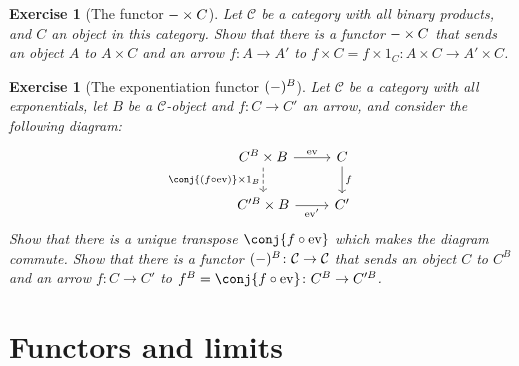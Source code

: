 \documentclass[article, a4paper, 11pt, oneside]{memoir}
\numberwithin{equation}{chapter}
\newcommand{\cat}[1]{\mathcal{#1}}
\newcommand{\catC}{\cat{C}}
\theoremstyle{myexample}
\theoremstyle{myexamplebreak}
\newtheorem{exercisebreak}[theorem]{Exercise}
\begin{document}
\begin{exercisebreak}[The functor $- \times C$]
    Let $\catC$ be a category with all binary products, and $C$ an object in this category. Show that there is a functor $- \times C$ that sends an object $A$ to $A \times C$ and an arrow $f \colon A \to A'$ to $f \times C = f \times 1_C \colon A \times C \to A' \times C$.
\end{exercisebreak}


\begin{exercisebreak}[The exponentiation functor $(-)^B$]
    Let $\catC$ be a category with all exponentials, let $B$ be a $\catC$-object and $f \colon C \to C'$ an arrow, and consider the following diagram:
    \begin{equation*}
        \begin{tikzcd}
            C^B \times B
                \ar[r, "\eval"]
                \ar[d, "\conj{(f \circ \eval)} \times 1_B", dashed, swap]
            & C
                \ar[d, "f"]
            \\
            C'^B \times B
                \ar[r, "\eval'", swap]
            & C'
        \end{tikzcd}
    \end{equation*}
    Show that there is a unique transpose $\conj{f \circ \eval}$ which makes the diagram commute. Show that there is a functor $(\blank)^B \colon \catC \to \catC$ that sends an object $C$ to $C^B$ and an arrow $f \colon C \to C'$ to $f^B = \conj{f \circ \eval} \colon C^B \to C'^B$.
\end{exercisebreak}



\chapter{Functors and limits}
\end{document}
